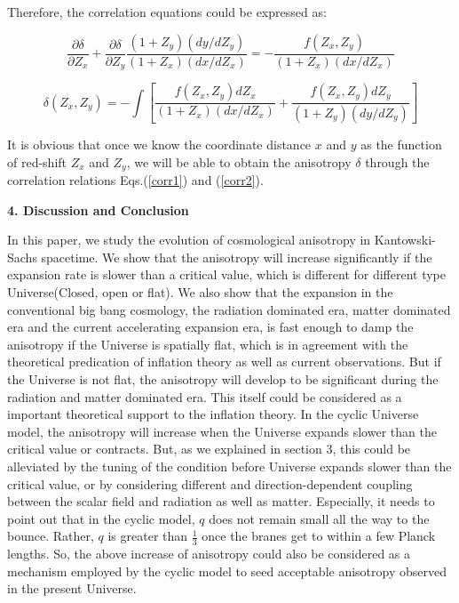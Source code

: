 \documentclass[a4paper,preprint]{revtex4}
\begin{document}
\noindent Therefore, the correlation equations could be expressed
as:

\begin{equation}\label{corr1}
\frac{\partial \delta}{\partial Z_x}+\frac{\partial
\delta}{\partial
Z_y}\frac{(1+Z_y)(dy/dZ_y)}{(1+Z_x)(dx/dZ_x)}=-\frac{f(Z_x,
Z_y)}{(1+Z_x)(dx/dZ_x)}
\end{equation}

\begin{equation}\label{corr2}
\delta(Z_x, Z_y)=-\int[\frac{f(Z_x,
Z_y)dZ_x}{(1+Z_x)(dx/dZ_x)}+\frac{f(Z_x,
Z_y)dZ_y}{(1+Z_y)(dy/dZ_y)}]
\end{equation}

It is obvious that once we know the coordinate distance $x$ and
$y$ as the function of red-shift $Z_x$ and $Z_y$, we will be able
to obtain the anisotropy $\delta$ through the correlation
relations Eqs.(\ref{corr1}) and (\ref{corr2}).

\vspace{0.4cm} \noindent\textbf{4. Discussion and Conclusion}
 \vspace{0.4cm}

In this paper, we study the evolution of cosmological anisotropy
in Kantowski-Sachs spacetime. We show that the anisotropy will
increase significantly if the expansion rate is slower than a
critical value, which is different for different type
Universe(Closed, open or flat). We also show that the expansion in
the conventional big bang cosmology, the radiation dominated era,
matter dominated era and the current accelerating expansion era,
is fast enough to damp the anisotropy if the Universe is spatially
flat, which is in agreement with the theoretical predication of
inflation theory as well as current observations. But if the
Universe is not flat, the anisotropy will develop to be
significant during the radiation and matter dominated era. This
itself could be considered as a important theoretical support to
the inflation theory. In the cyclic Universe model, the anisotropy
will increase when the Universe expands slower than the critical
value or contracts. But, as we explained in section 3, this could
be alleviated by the tuning of the condition before Universe
expands slower than the critical value, or by considering
different and direction-dependent coupling between the scalar
field and radiation as well as matter. Especially, it needs to
point out that in the cyclic model, $q$ does not remain small all
the way to the bounce. Rather, $q$ is greater than $\frac{1}{3}$
once the branes get to within a few Planck
lengths\cite{steinhardt3}. So, the above increase of anisotropy
could also be considered as a mechanism employed by the cyclic
model to seed acceptable anisotropy observed in the present
Universe.
\end{document}
